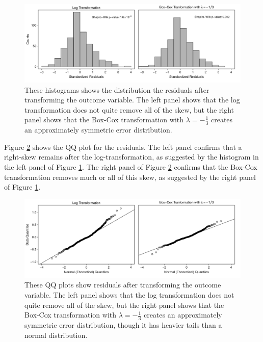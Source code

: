 \documentclass[12pt]{article}
\begin{document}
\begin{figure}[h!]
\begin{center}
\includegraphics[width = \textwidth]{figs/cg-trans-residuals-hist.pdf}
\caption{These histograms shows the distribution the residuals after transforming the outcome variable. 
The left panel shows that the log transformation does not quite remove all of the skew, but the right panel shows that the Box-Cox transformation with $\lambda = -\frac{1}{3}$ creates an approximately symmetric error distribution.}\label{fig:cg-trans-residuals-hist}
\end{center}
\end{figure}

Figure \ref{fig:cg-trans-qq-plot} shows the QQ plot for the residuals. 
The left panel confirms that a right-skew remains after the log-transformation, as suggested by the histogram in the left panel of Figure \ref{fig:cg-trans-residuals-hist}. 
The right panel of Figure \ref{fig:cg-trans-qq-plot} confirms that the Box-Cox transformation removes much or all of this skew, as suggested by the right panel of Figure \ref{fig:cg-trans-residuals-hist}. 

\begin{figure}[h!]
\begin{center}
\includegraphics[width = \textwidth]{figs/cg-trans-qq-plot.pdf}
\caption{These QQ plots show residuals after transforming the outcome variable.
The left panel shows that the log transformation does not quite remove all of the skew, but the right panel shows that the Box-Cox transformation with $\lambda = -\frac{1}{3}$ creates an approximately symmetric error distribution, though it has heavier tails than a normal distribution.}\label{fig:cg-trans-qq-plot}
\end{center}
\end{figure}
\end{document}
